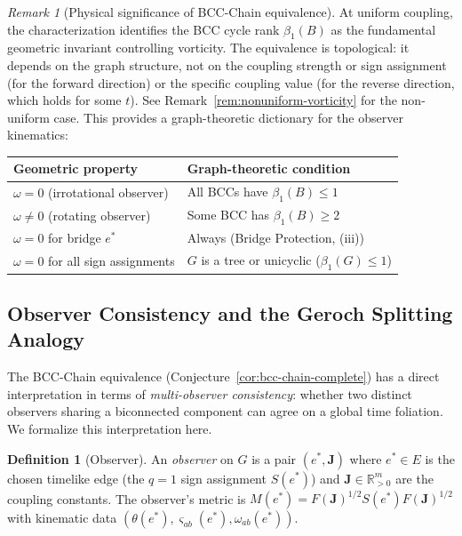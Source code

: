 \documentclass[11pt]{article}
\theoremstyle{definition}
\newtheorem{definition}[theorem]{Definition}
\theoremstyle{remark}
\newtheorem{remark}[theorem]{Remark}
\newcommand{\Fish}{F}
\newcommand{\sgn}{S}
\newcommand{\Met}{M}
\newcommand{\vort}{\omega}
\newcommand{\coupl}{\mathbf{J}}
\newcommand{\betti}{\beta_1}
\newcommand{\expan}{\theta}
\newcommand{\shear}{\varsigma} %
\begin{document}
\begin{remark}[Physical significance of BCC-Chain equivalence]
At uniform coupling, the characterization identifies the BCC cycle rank
$\betti(B)$ as the fundamental geometric invariant controlling vorticity.
The equivalence is topological: it depends on the graph structure, not
on the coupling strength or sign assignment (for the forward direction)
or the specific coupling value (for the reverse direction, which holds
for some $t$). See Remark~\ref{rem:nonuniform-vorticity} for the
non-uniform case.
This provides a graph-theoretic dictionary for the observer kinematics:
\begin{center}
\renewcommand{\arraystretch}{1.3}
\begin{tabular}{p{5.5cm}|p{6cm}}
\toprule
\textbf{Geometric property} & \textbf{Graph-theoretic condition} \\
\midrule
$\vort = 0$ (irrotational observer) & All BCCs have $\betti(B) \leq 1$ \\
$\vort \neq 0$ (rotating observer) & Some BCC has $\betti(B) \geq 2$ \\
$\vort = 0$ for bridge $e^*$ & Always (Bridge Protection, (iii)) \\
$\vort = 0$ for all sign assignments & $G$ is a tree or unicyclic ($\betti(G) \leq 1$) \\
\bottomrule
\end{tabular}
\end{center}
\end{remark}

\subsection{Observer Consistency and the Geroch Splitting Analogy}
\label{subsec:observer-consistency}

The BCC-Chain equivalence (Conjecture~\ref{cor:bcc-chain-complete}) has a direct interpretation in terms of
\emph{multi-observer consistency}: whether two distinct observers sharing
a biconnected component can agree on a global time foliation.  We formalize
this interpretation here.

\begin{definition}[Observer]
\label{def:observer}
An \emph{observer} on $G$ is a pair $(e^*, \coupl)$ where $e^* \in E$
is the chosen timelike edge (the $q = 1$ sign assignment $\sgn(e^*)$)
and $\coupl \in \mathbb{R}^m_{>0}$ are the coupling constants.
The observer's metric is $\Met(e^*) = \Fish(\coupl)^{1/2} \sgn(e^*) \Fish(\coupl)^{1/2}$
with kinematic data $(\expan(e^*), \shear_{ab}(e^*), \vort_{ab}(e^*))$.
\end{definition}
\end{document}
